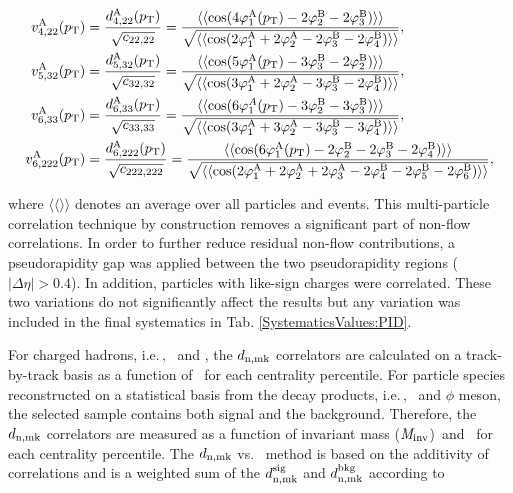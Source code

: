 \begin{align}
v_{4,22}^{\rm{A}}(p_{\rm{T}}) &= \frac{d_{4,22}^{\rm{A}}(p_{\rm{T}})}{\sqrt{c_{22,22}}} =  \frac{\langle\langle \cos(4\varphi^{\rm{A}}_{1}(p_{\rm{T}})-2\varphi^{\rm{B}}_{2}-2\varphi^{\rm{B}}_{3})\rangle\rangle}{\sqrt{\langle\langle \cos(2\varphi^{\rm{A}}_{1}+2\varphi^{\rm{A}}_{2}-2\varphi^{\rm{B}}_{3}-2\varphi^{\rm{B}}_{4}) \rangle\rangle}}, \label{Eq:VA422} \\
v_{5,32}^{\rm{A}}(p_{\rm{T}}) &= \frac{d_{5,32}^{\rm{A}}(p_{\rm{T}})}{\sqrt{c_{32,32}}} = \frac{\langle\langle \cos(5\varphi^{\rm{A}}_{1}(p_{\rm{T}})-3\varphi^{\rm{B}}_{3}-2\varphi^{\rm{B}}_{2})\rangle\rangle}{\sqrt{\langle\langle \cos(3\varphi^{\rm{A}}_{1}+2\varphi^{\rm{A}}_{2}-3\varphi^{\rm{B}}_{3}-2\varphi^{\rm{B}}_{4}) \rangle\rangle}}, \label{Eq:VA532}\\
v_{6,33}^{\rm{A}}(p_{\rm{T}}) &= \frac{d_{6,33}^{\rm{A}}(p_{\rm{T}})}{\sqrt{c_{33,33}}} =\frac{\langle\langle \cos(6\varphi^{A}_{1}(p_{\rm{T}})-3\varphi^{\rm{B}}_{2}-3\varphi^{\rm{B}}_{3})\rangle\rangle}{\sqrt{\langle\langle \cos(3\varphi^{\rm{A}}_{1}+3\varphi^{\rm{A}}_{2}-3\varphi^{\rm{B}}_{3}-3\varphi^{\rm{B}}_{4}) \rangle\rangle}}, \label{Eq:VA633}\\
v_{6,222}^{\rm{A}}(p_{\rm{T}}) &= \frac{d_{6,222}^{\rm{A}}(p_{\rm{T}})}{\sqrt{c_{222,222}}} =\frac{\langle\langle \cos(6\varphi^{\rm{A}}_{1}(p_{\rm{T}})-2\varphi^{\rm{B}}_{2}-2\varphi^{\rm{B}}_{3}-2\varphi^{\rm{B}}_{4})\rangle\rangle}{\sqrt{\langle\langle \cos(2\varphi^{\rm{A}}_{1}+2\varphi^{\rm{A}}_{2}+2\varphi^{\rm{A}}_{3}-2\varphi^{\rm{B}}_{4}-2\varphi^{\rm{B}}_{5}-2\varphi^{\rm{B}}_{6}) \rangle\rangle}},
\label{Eq:VA6222}
\end{align}

where $\langle\langle\rangle\rangle$ denotes an average over all particles and events.
This multi-particle correlation technique by construction removes a significant part of non-flow correlations. In order to further reduce residual non-flow contributions, a pseudorapidity gap was applied between the two pseudorapidity regions ($|\Delta\eta|>0.4$). In addition, particles with like-sign charges were correlated. These two variations do not significantly affect the results but any variation was included in the final systematics in Tab. \ref{SystematicsValues:PID}.

For charged hadrons, i.e.\,\pion, \kaon~and \proton, the $d_{\rm n,mk}$ correlators are calculated on a track-by-track basis as a function of \pT~for each centrality percentile. For particle species reconstructed on a statistical basis from the decay products, i.e.\,\Ks, \lambdas~and $\phi$ meson, the selected sample contains both signal and the background. Therefore, the $d_{\rm n,mk}$ correlators are measured as a function of invariant mass (${\it M}_{\rm inv}$)~and \pT~for each centrality percentile. The $d_{\rm n,mk}$ vs. \minv~method is based on the additivity of correlations and is a weighted sum of the $d_{\rm n,mk}^{\rm{sig}}$ and $d_{\rm n,mk}^{\rm{bkg}}$ according to

